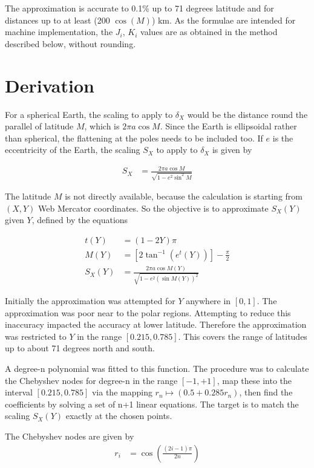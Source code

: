 \documentclass[10pt,a4paper,twocolumn]{article}
\begin{document}
The approximation is accurate to 0.1\% up to 71 degrees latitude and for
distances up to at least (200 $\cos(M)$) km.  As the formulae are intended for
machine implementation, the $J_i$, $K_i$ values are as obtained in the method
described below, without rounding.

\section {Derivation}
For a spherical Earth, the scaling to apply to $\delta_X$ would be the distance
round the parallel of latitude $M$, which is $2\pi a \cos M$.  Since the Earth
is ellipsoidal rather than spherical, the flattening at the poles needs to be
included too.  If $e$ is the eccentricity of the Earth, the scaling $S_X$ to
apply to $\delta_X$ is given by

\begin{align}
S_X & = \frac {2\pi a \cos M}{\sqrt{1 - e^2 \sin^2M}}
\end{align}

The latitude $M$ is not directly available, because the calculation is starting
from $(X,Y)$ Web Mercator coordinates.  So the objective is to approximate
$S_X(Y)$ given $Y$, defined by the equations

\begin{align}
t(Y) &= (1 - 2Y)\pi \\
M(Y) &= \left[2\tan^{-1}\left(e^t(Y)\right)\right] - \frac{\pi}{2} \\
S_X(Y) & = \frac {2\pi a \cos M(Y)}{\sqrt{1 - e^2 \left(\sin M(Y)\right)^2}}
\end{align}

Initially the approximation was attempted for $Y$ anywhere in $[0,1]$.  The
approximation was poor near to the polar regions.  Attempting to reduce this
inaccuracy impacted the accuracy at lower latitude.  Therefore the
approximation was restricted to $Y$ in the range $[0.215,0.785]$.  This covers
the range of latitudes up to about 71 degrees north and south.

A degree-n polynomial was fitted to this function.  The procedure was to
calculate the Chebyshev nodes for degree-n in the range $[-1,+1]$, map these
into the interval $[0.215,0.785]$ via the mapping $r_n \mapsto (0.5 +
0.285r_n)$, then find the coefficients by solving a set of n+1 linear
equations. The target is to match the scaling $S_X(Y)$ exactly at the chosen
points.

The Chebyshev nodes are given by
\begin{align}
  r_i & = \cos \left(
  \frac{\left(2i-1\right)\pi}{2n}
  \right)
\end{align}
\end{document}
